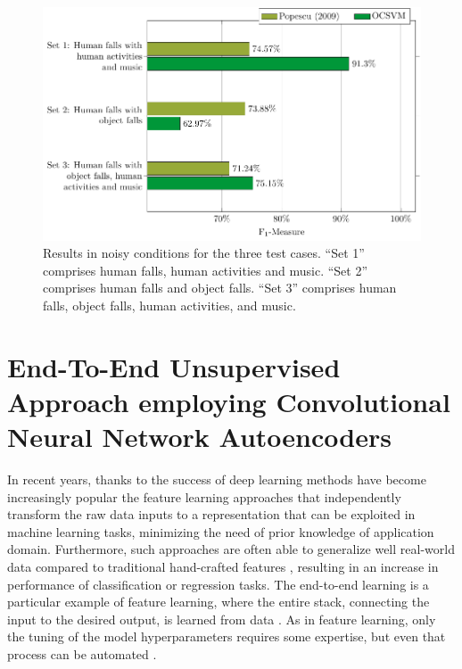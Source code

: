 \begin{figure}[htb]
	\centering
	\includegraphics[width=\columnwidth]{img/cin_only_ocsv/res_noisy.pdf}
	\caption{Results in noisy conditions for the three test cases. ``Set 1'' comprises human falls, human activities and music. ``Set 2'' comprises human falls and object falls. ``Set 3'' comprises human falls, object falls, human activities, and music.} \label{fig:res_noisy}
\end{figure}




\section[End-To-End Unsupervised Approach employing CNN-AE]{End-To-End Unsupervised Approach employing Convolutional Neural Network Autoencoders} 
\label{sec:autoencoder}



In recent years, thanks to the success of deep learning methods have become increasingly popular the feature learning approaches that independently transform the raw data inputs to a representation that can be exploited in machine learning tasks, minimizing the need of prior knowledge of application domain. 
Furthermore, such approaches are often able to generalize well real-world data compared to traditional hand-crafted features \cite{Principi14c}, resulting in an increase in performance of classification or regression tasks. The end-to-end learning is a particular example of feature learning, where the entire stack, connecting the input to the desired output, is learned from data \cite{muller2006off}. As in feature learning, only the tuning of the model hyperparameters requires some expertise, but even that process can be automated \cite{bergstra2013making}.

